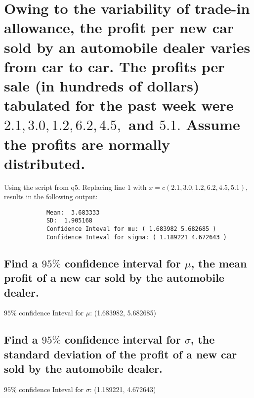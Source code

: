 \documentclass[10pt, letterpaper, titlepage]{article}
\begin{document}
    \newpage
    \section{Owing to the variability of trade-in allowance, the profit per new car sold by an
        automobile dealer varies from car to car. The profits per sale (in hundreds of dollars)
        tabulated for the past week were $2.1, 3.0, 1.2, 6.2, 4.5,$ and $5.1.$ Assume the profits are
        normally distributed.}

        Using the script from q5. Replacing line $1$ with $x = c(2.1,3.0,1.2,6.2,4.5,5.1)$,
        results in the following output:
        \begin{verbatim}
            Mean:  3.683333 
            SD:  1.905168 
            Confidence Inteval for mu: ( 1.683982 5.682685 )
            Confidence Inteval for sigma: ( 1.189221 4.672643 )
        \end{verbatim}

        \subsection{Find a $95\%$ confidence interval for $\mu$, the mean profit of a new car sold by the
            automobile dealer.}
            $95\%$ confidence Inteval for $\mu$: (1.683982, 5.682685)

        \subsection{Find a $95\%$ confidence interval for $\sigma$, the standard deviation of the profit of a new
            car sold by the automobile dealer.}
            $95\%$ confidence Inteval for $\sigma$: (1.189221, 4.672643)
\end{document}
